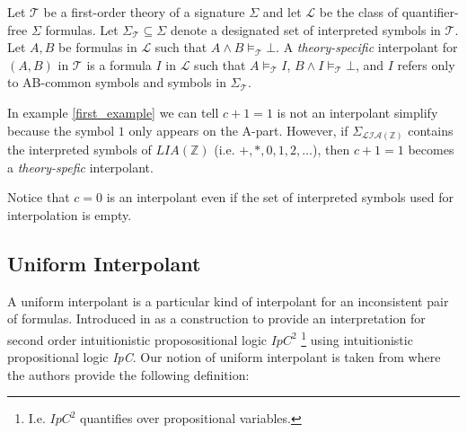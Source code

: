 \begin{definition} \cite{10.1007/11532231_26}
  Let $\mathcal{T}$ be a first-order theory of a signature $\Sigma$ and 
  let $\mathcal{L}$ be the class of quantifier-free $\Sigma$ formulas.
  Let $\Sigma_\mathcal{T} \subseteq \Sigma$ denote a designated set
  of interpreted symbols in $\mathcal{T}$. Let $A, B$ be formulas
  in $\mathcal{L}$ such that $A \land B \models_{\mathcal{T}} \bot$.
  A \emph{theory-specific} interpolant for $(A, B)$ in $\mathcal{T}$
  is a formula $I$ in $\mathcal{L}$ such that 
  $A \models_{\mathcal{T}} I$, $B \land I \models_{\mathcal{T}} \bot$,
  and $I$ refers only to AB-common symbols and symbols in 
  $\Sigma_{\mathcal{T}}$.
\end{definition}

\begin{example}
  In example \ref{first_example} we can tell $c + 1 = 1$ is not an
  interpolant simplify because the symbol $1$ only appears on the
  A-part. However, if $\Sigma_{\mathcal{LIA(\mathbb{Z})}}$ contains the
  interpreted symbols of $LIA(\mathbb{Z})$ (i.e. $+, *, 0, 1, 2, \dots$),
  then $c + 1 = 1$ becomes a \emph{theory-spefic} interpolant. 

  Notice that $c = 0$ is an interpolant even if the set of interpreted symbols 
  used for interpolation is empty.
\end{example}

\subsection{Uniform Interpolant}

A uniform interpolant is a particular kind of interpolant for an inconsistent
pair of formulas. Introduced in \cite{pitts1992} as a 
construction to provide an interpretation
for second order intuitionistic proposositional logic 
\emph{$IpC^2$}
\footnote{I.e. $IpC^2$ quantifies over 
propositional variables.}
using intuitionistic propositional logic \emph{IpC}.
Our notion of uniform interpolant is taken 
from \cite{ghilardi2020compactly}
where the authors provide the following definition:

